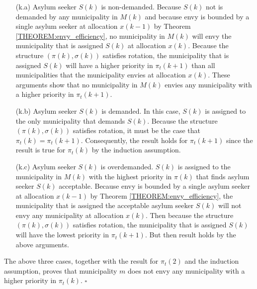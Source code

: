 \documentclass[12pt,fleqn]{article}
\begin{document}
\begin{itemize}

\item[(k.a)] Asylum seeker $S(k)$ is non-demanded. Because $S(k)$ not is demanded by any municipality in $M(k)$
and because envy is bounded by a single asylum seeker at allocation $x(k-1)$ by Theorem \ref{THEOREM:envy_efficiency}, no
municipality in $M(k)$ will envy the municipality that is assigned $S(k)$ at allocation $x(k)$. Because the structure
$(\pi(k),\sigma(k))$ satisfies rotation, the municipality that is assigned $S(k)$ will have a higher priority
in $\pi_t(k+1)$ than all municipalities that the municipality envies at allocation $x(k)$. These arguments show that
no municipality in $M(k)$ envies any municipality with a higher priority in $\pi_t(k+1)$.

\item[(k.b)] Asylum seeker $S(k)$ is demanded. In this case, $S(k)$ is assigned to the only municipality that demands
$S(k)$. Because the structure $(\pi(k),\sigma(k))$ satisfies rotation, it must be the case that $\pi_t(k)=\pi_t(k+1)$. Consequently, the result holds for $\pi_t(k+1)$ since the result is true for $\pi_t(k)$ by the induction assumption.

\item[(k.c)] Asylum seeker $S(k)$ is overdemanded. $S(k)$ is assigned to the municipality in $M(k)$ with the highest
priority in $\pi(k)$ that finds asylum seeker $S(k)$ acceptable. Because envy is bounded by a single asylum seeker
at allocation $x(k-1)$ by Theorem \ref{THEOREM:envy_efficiency}, the municipality that is assigned the acceptable asylum seeker $S(k)$ will
not envy any municipality at allocation $x(k)$. Then because the structure $(\pi(k),\sigma(k))$ satisfies rotation,
the municipality that is assigned $S(k)$ will have the lowest priority in $\pi_t(k+1)$. But then result holds by the above arguments.

\end{itemize}

\noindent The above three cases, together with the result for $\pi_t(2)$ and the induction assumption, proves that
municipality $m$ does not envy any municipality with a higher priority in $\pi_t(k)$. \hfill $\square$

\medskip
\end{document}
